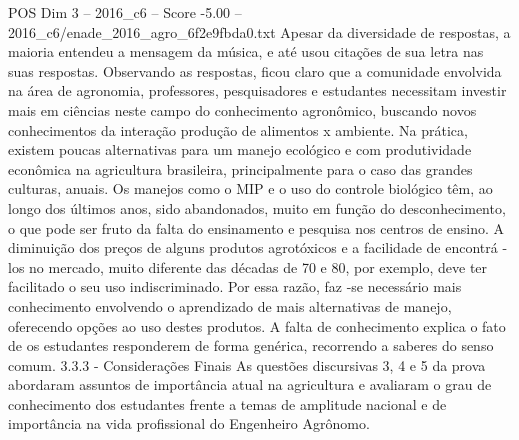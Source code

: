 \begin{textsample}{POS Dim 3 – 2016\_c6 – Score -5.00 – 2016\_c6/enade\_2016\_agro\_6f2e9fbda0.txt}
Apesar da diversidade de respostas, a maioria entendeu a mensagem da música, e até usou citações de sua letra nas suas respostas.
Observando as respostas, ficou claro que a comunidade envolvida na área de agronomia, professores, pesquisadores e estudantes necessitam investir mais em ciências neste campo do conhecimento agronômico, buscando novos conhecimentos da interação produção de alimentos x ambiente.
Na prática, existem poucas alternativas para um manejo ecológico e com produtividade econômica na agricultura brasileira, principalmente para o caso das grandes culturas, anuais.
Os manejos como o MIP e o uso do controle biológico têm, ao longo dos últimos anos, sido abandonados, muito em função do desconhecimento, o que pode ser fruto da falta do ensinamento e pesquisa nos centros de ensino.
A diminuição dos preços de alguns produtos agrotóxicos e a facilidade de encontrá -los no mercado, muito diferente das décadas de 70 e 80, por exemplo, deve ter facilitado o seu uso indiscriminado.
Por essa razão, faz -se necessário mais conhecimento envolvendo o aprendizado de mais alternativas de manejo, oferecendo opções ao uso destes produtos.
A falta de conhecimento explica o fato de os estudantes responderem de forma genérica, recorrendo a saberes do senso comum. 3.3.3 - Considerações Finais As questões discursivas 3, 4 e 5 da prova abordaram assuntos de importância atual na agricultura e avaliaram o grau de conhecimento dos estudantes frente a temas de amplitude nacional e de importância na vida profissional do Engenheiro Agrônomo.

\end{textsample}

